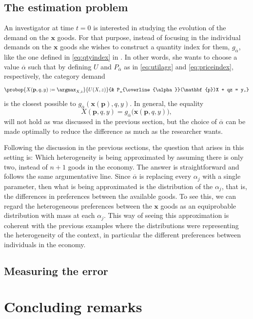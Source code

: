 \documentclass[english, a4paper,12pt]{article}
\begin{document}
\subsection{The estimation problem} \label{ssec:OneGoodProblem}
An investigator at time $t=0$ is interested in studying the evolution of the demand on the $\mathbf{x}$ goods. For that purpose, instead of focusing in the individual demands on the $\mathbf{x}$ goods she wishes to construct a quantity index for them, $g_{\overline{\alpha}}$, like the one defined in \eqref{eq:qtyindex} in . In other words, she wants to choose a value $\overline{\alpha}$ such that by defining $U$ and $P_{\overline{\alpha}}$ as in \eqref{eq:utilagg} and \eqref{eq:priceindex}, respectively, the category demand
	\begin{equation} \label{eq:probagg2}
		\probop{X(\mathbf{p}, q, y) := \argmax_{X, z}}{U(X,z)}
										{&	P_{\overline{\alpha}}(\mathbf{p})X + qz = y,}
	\end{equation}
is the closest possible to $g_{\overline{\alpha}}(\mathbf{x}(\mathbf{p}),q,y)$. In general, the equality
	$$X(\mathbf{p}, q, y) = g_{\overline{\alpha}}\big(\mathbf{x}(\mathbf{p}, q, y)\big),$$
will not hold as was discussed in the previous section, but the choice of $\overline{\alpha}$ can be made optimally to reduce the difference as much as the researcher wants.

Following the discussion in the previous sections, the question that arises in this setting is: Which heterogeneity is being approximated by assuming there is only two, instead of $n+1$ goods in the economy. The answer is straightforward and follows the same argumentative line. Since $\overline{\alpha}$ is replacing every $\alpha_{j}$ with a single parameter, then what is being approximated is the distribution of the $\alpha_{j}$, that is, the differences in preferences between the available goods. To see this, we can regard the heterogeneous preferences between the $\mathbf{x}$ goods as an equiprobable distribution with mass at each $\alpha_{j}$. This way of seeing this approximation is coherent with the previous examples where the distributions were representing the heterogeneity of the context, in particular the different preferences between individuals in the economy.

\subsection{Measuring the error} \label{ssec:OneGoodError}


\section{Concluding remarks} \label{sec:Conclusion}




\end{document}
